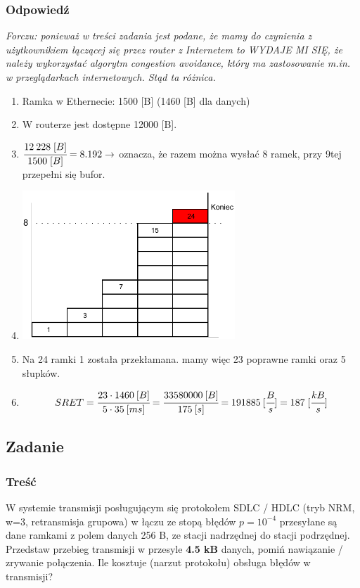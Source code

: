 		\subsubsection{Odpowiedź}
			{\small \emph{Forczu: ponieważ w treści zadania jest podane, że mamy do czynienia z użytkownikiem łączącej się przez router z Internetem to WYDAJE MI SIĘ, że należy wykorzystać algorytm \emph{congestion avoidance}, który ma zastosowanie m.in. w przeglądarkach internetowych. Stąd ta różnica.}}\\
			\begin{enumerate}
				\item Ramka w Ethernecie: 1500 [B] (1460 [B] dla danych)
				\item W routerze jest dostępne 12000 [B].
				\item $ \cfrac{12\:228\;[B]}{1500\;[B]}=8.192 \rightarrow $ oznacza, że razem można wysłać 8 ramek, przy 9tej przepełni się bufor.
				\item \includegraphics[width=8.0cm]{./images/zadanie15.pdf}
				\item Na 24 ramki 1 została przekłamana. mamy więc 23 poprawne ramki oraz 5 słupków.
				\item $$ SRET=\cfrac{23\cdot1460\:[B]}{5\cdot35\:[ms]}=\cfrac{33580000\:[B]}{175\:[s]}=191885\:[\cfrac{B}{s}]=187\;[\cfrac{kB}{s}] $$
			\end{enumerate}
			
\newpage
	\subsection{Zadanie}
		\subsubsection{Treść}
			W systemie transmisji posługującym się protokołem SDLC / HDLC (tryb NRM, w=3, retransmisja grupowa) w łączu ze stopą błędów $ p=10^{-4} $ przesyłane są dane ramkami z polem danych 256 B, ze stacji nadrzędnej do stacji podrzędnej. Przedstaw przebieg transmisji w przesyle \textbf{4.5 kB} danych, pomiń nawiązanie / zrywanie połączenia. Ile kosztuje (narzut protokołu) obsługa błędów w transmisji?
